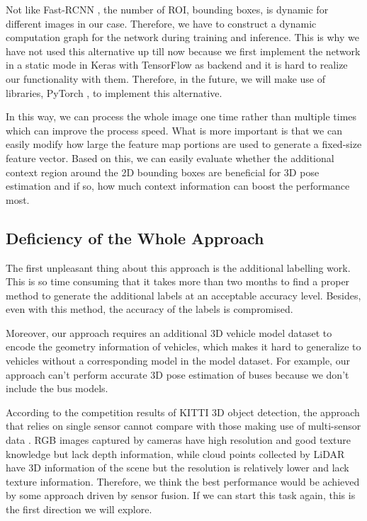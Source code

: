 \documentclass[a4paper,12pt]{article}
\begin{document}
Not like Fast-RCNN \cite{DBLP:journals/corr/Girshick15}, the number of ROI, \ie bounding boxes, is dynamic for different images in our case. Therefore, we have to construct a dynamic computation graph for the network during training and inference. This is why we have not used this alternative up till now because we first implement the network in a static mode in Keras \cite{chollet2015keras} with TensorFlow \cite{tensorflow2015-whitepaper} as backend and it is hard to realize our functionality with them. Therefore, in the future, we will make use of libraries, \ie PyTorch \cite{paszke2017automatic}, to implement this alternative.

In this way, we can process the whole image one time rather than multiple times which can improve the process speed. What is more important is that we can easily modify how large the feature map portions are used to generate a fixed-size feature vector. Based on this, we can easily evaluate whether the additional context region around the 2D bounding boxes are beneficial for 3D pose estimation and if so, how much context information can boost the performance most.  


\subsection{Deficiency of the Whole Approach}
The first unpleasant thing about this approach is the additional labelling work. This is so time consuming that it takes more than two months to find a proper method to generate the additional labels at an acceptable accuracy level. Besides, even with this method, the accuracy of the labels is compromised.

Moreover, our approach requires an additional 3D vehicle model dataset to encode the geometry information of vehicles, which makes it hard to generalize to vehicles without a corresponding model in the model dataset. For example, our approach can't perform accurate 3D pose estimation of buses because we don't include the bus models.

According to the competition results of KITTI 3D object detection, the approach that relies on single sensor cannot compare with those making use of multi-sensor data \cite{3dobject}. RGB images captured by cameras have high resolution and good texture knowledge but lack depth information, while cloud points collected by LiDAR have 3D information of the scene but the resolution is relatively lower and lack texture information. Therefore, we think the best performance would be achieved by some approach driven by sensor fusion. If we can start this task again, this is the first direction we will explore.
\end{document}
